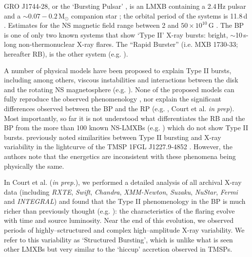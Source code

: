 \par GRO J1744-28, or the `Bursting Pulsar' \citep[hereafter BP,][]{Paciesas_BPDiscovery}, is an LMXB containing a 2.4\,Hz pulsar and a $\sim0.07-0.2$\,M$_\odot$ companion star \citep[e.g.][]{Sturner_BPNature,Finger_BP,Rappaport_BPHistory,Degenaar_BPSpec}; the orbital period of the systems is 11.8\,d \citep{Finger_Pulse,Sanna_BP}. Estimates for the NS magnetic field range between 2 and $50\times10^{10}$\,G \citep{Finger_BP,Degenaar_BPSpec,Dai_OB3,Doroshenko_NBFlash}. The BP is one of only two known systems that show `Type II' X-ray bursts: bright, $\sim$10\,s-long non-thermonuclear X-ray flares. The ``Rapid Burster'' (i.e. MXB 1730-33; hereafter RB), is the other system (e.g. \citealp{Lewin_TypeII,Kouveliotou_BP}).
\par A number of physical models have been proposed to explain Type II bursts, including among others, viscous instabilities and interactions between the disk and the rotating NS magnetosphere (e.g. \citealp{Taam_Evo,Spruit_Type2Mod}). None of the proposed models can fully reproduce the observed phenomenology \citep{Lewin_Bursts}, nor explain the significant differences observed between the BP and the RP (e.g. \citealp{Lewin_BP}, Court et al. \textit{in prep}). Most importantly, so far it is not understood what differentiates the RB and the BP from the more than 100 known NS-LMXBs (e.g. \citealp{Liu_Catalog}) which do not show Type II bursts. \citealp{DeMartino_XSS} previously noted similarities between Type II bursting and X-ray variability in the lightcurve of the TMSP 1FGL J1227.9-4852 \citep{Hill_XSS}. However, the authors note that the energetics are inconsistent with these phenomena being physically the same.
\par In Court et al. (\textit{in prep.}), we performed a detailed analysis of all archival X-ray data (including \textit{RXTE}, \textit{Swift}, \textit{Chandra}, \textit{XMM-Newton}, \textit{Suzaku}, \textit{NuStar}, \textit{Fermi} and \textit{INTEGRAL}) and found that the Type II phenomenology in the BP is much richer than previously thought (e.g. \citealp{Giles_BP}): the characteristics of the flaring evolve with time and source luminosity. Near the end of this evolution, we observed periods of highly--sctructured and complex high--amplitude X-ray variability. We refer to this variability as `Structured Bursting', which is unlike what is seen other LMXBs but very similar to the `hiccup' accretion observed in TMSPs.

\vspace{-2em} %

